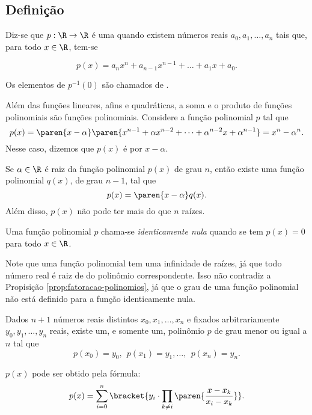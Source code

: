 \subsection{Definição}

\begin{definition}
Diz-se que $p: \R \to \R$ é uma  quando
existem números reais $a_0, a_1, \dots , a_n$ tais que, para todo $x
\in \R$, tem-se

\begin{equation}\label{funcpol}
p(x) = a_n x^n + a_{n-1} x^{n-1} + \dots + a_1 x + a_0.
\end{equation}

Os elementos de $p^{-1}(0)$ são chamados de .
\end{definition}

\begin{example}
Além das funções lineares, afins e quadráticas, a soma e o produto
de funções polinomiais são funções polinomiais. Considere a função
polinomial $p$ tal que $$p(x) = \paren{x - \alpha} \paren{x^{n-1} +
\alpha x^{n-2} + \dots + \alpha^{n-2}x+ \alpha^{n-1}}=x^n -
\alpha^n.$$ Nesse caso, dizemos que $p(x)$ é  por $x-
\alpha$.
\end{example}

\begin{proposition}
\label{prop:fatoracao-polinomios}
Se $\alpha \in \R$ é raiz da função polinomial $p(x)$ de grau $n$,
então existe uma função polinomial $q(x)$, de grau $n-1$, tal que
$$p(x) = \paren{x- \alpha}q(x).$$
Além disso, $p(x)$ não pode ter mais do que $n$ raízes.
\end{proposition}

\begin{definition}
Uma função polinomial $p$ chama-se \emph{identicamente nula} quando
se tem $p(x) = 0$ para todo $x \in \R$.
\end{definition}

\begin{remark}
Note que uma função polinomial tem uma infinidade de raízes, 
já que todo número real é raiz de do polinômio correspondente. 
Isso não contradiz a Propisição \ref{prop:fatoracao-polinomios}, 
já que o grau de uma função polinomial não está definido para a função identicamente nula.
\end{remark}

\begin{proposition}
Dados $n+1$ números reais distintos $x_0, x_1 , \dots , x_n$ e
fixados arbitrariamente $y_0, y_1, \dots, y_n$ reais, existe
um, e somente um, polinômio $p$ de grau menor ou igual a $n$ tal que
$$p(x_0) = y_0, \ \ p(x_1) = y_1,  \dots , \ \ p(x_n) = y_n.$$

$p(x)$ pode ser obtido pela fórmula:
$$p(x) = \sum_{i=0}^{n} \bracket{y_i \cdot \prod_{k \neq i} \paren{\frac {x-
x_k}{x_i-x_k}}}.$$
\end{proposition}